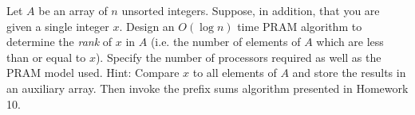 Let $A$ be an array of $n$ unsorted integers.  Suppose, in addition,
that you are given a single integer $x$.
Design an $O(\log  n)$ time PRAM algorithm to determine the {\em rank} of
$x$ in $A$ (i.e. the number of elements of $A$ which are less than or equal
to $x$).  Specify the number of processors required as well as the PRAM
model used.  Hint:  Compare $x$ to all elements of $A$ and store the results
in an auxiliary array.  Then invoke the prefix sums algorithm presented in
Homework 10.
